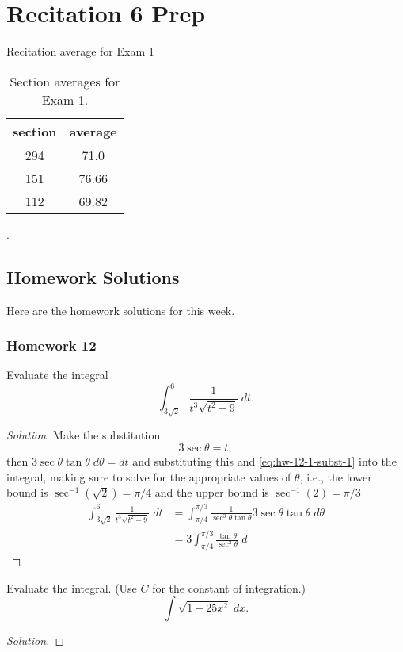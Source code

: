 \chapter{Recitation 6 Prep}
Recitation average for Exam 1
\begin{table}[htbp]
\caption{Section averages for Exam 1.}
\label{tab:sec-avg}
\centering
\begin{tabular}{|c|c|}
\hline
section&average\\
\hline
294&71.0\\
151&76.66\\
112&69.82\\
\hline
\end{tabular}.
\end{table}
\section{Homework Solutions}
Here are the homework solutions for this week.
\subsection{Homework 12}
\begin{problem}[WebAssign, HW 12, \# 1]
Evaluate the integral
\[
\int_{3\sqrt{2}}^6\frac{1}{t^3\sqrt{t^2-9}}\;dt.
\]
\end{problem}
\begin{proof}[Solution]
Make the substitution
\begin{equation}
\label{eq:hw-12-1-subst-1}
3\sec\theta=t,
\end{equation}
then $3\sec\theta\tan\theta\;d\theta=dt$ and substituting this and
\eqref{eq:hw-12-1-subst-1} into the integral, making sure to solve for the
appropriate values of $\theta$, i.e., the lower bound is
$\sec^{-1}\left(\sqrt{2}\right)=\pi/4$ and the upper bound is
$\sec^{-1}(2)=\pi/3$
\begin{align*}
\int_{3\sqrt{2}}^6\frac{1}{t^3\sqrt{t^2-9}}\;dt
&=\int_{\pi/4}^{\pi/3}\frac{1}{\sec^3\theta\tan\theta}3\sec\theta\tan\theta\;d\theta\\
&=3\int_{\pi/4}^{\pi/3}\frac{\tan\theta}{\sec^2\theta}\;d
\end{align*}
\end{proof}

\begin{problem}[WebAssign, HW 12, \# 2]
Evaluate the integral. (Use $C$ for the constant of integration.)
\[
\int\sqrt{1-25x^2}\;dx.
\]
\end{problem}
\begin{proof}[Solution]
\end{proof}

